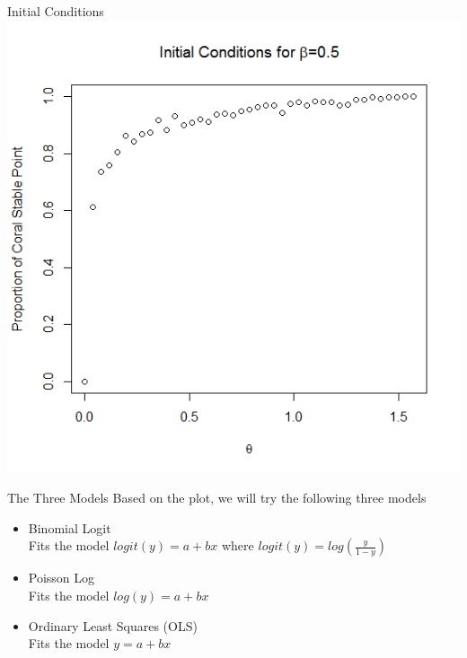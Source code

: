 \begin{frame}{Initial Conditions}
\includegraphics[scale=.425]{ic.png}
\end{frame}

\begin{frame}{The Three Models}
Based on the plot, we will try the following three models
\begin{itemize}
\item Binomial Logit\\
Fits the model $logit(y)=a+bx$ where $logit(y)=log(\frac{y}{1-y})$\\
\item Poisson Log\\
Fits the model $log(y)=a+bx$\\
\item Ordinary Least Squares (OLS)\\
Fits the model $y=a+bx$\\
\end{itemize}
\end{frame}


